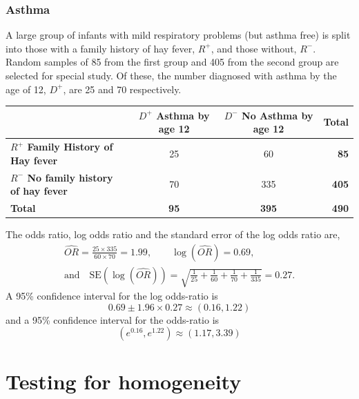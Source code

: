 \documentclass[a4paper]{article}\usepackage[]{graphicx}\usepackage[]{xcolor}
\begin{document}
\subsubsection{Asthma}
A large group of infants with mild respiratory problems (but asthma free) is split into those with a family history of hay fever, \textcolor{myred}{\( R^+ \)}, and those without, \textcolor{myred}{\( R^- \)}. Random samples of 85 from the first group and 405 from the second group are selected for special study. Of these, the number diagnosed with asthma by the age of 12, \textcolor{mygreen}{\( D^+ \)}, are 25 and 70 respectively.
\begin{table}[H]
	\centering
	\begin{tabular}{@{}lccr@{}}
	\toprule
				 														 & \textcolor{mygreen}{\textbf{\( D^+ \) Asthma by age 12}} & \textcolor{mygreen}{\textbf{\( D^- \) No Asthma by age 12}} & \textbf{Total}    \\ \midrule
	\textcolor{myred}{\textbf{\( R^+ \) Family History of Hay fever}}    & 25    		  											& 60        		                                          & \textcolor{myred}{\textbf{85}}  \\
	\textcolor{myred}{\textbf{\( R^- \) No family history of hay fever}} & 70    		  											& 335       		                                          & \textcolor{myred}{\textbf{405}} \\ \midrule
	\textbf{Total} 													     & \textbf{95}    											& \textbf{395}                                                & \textbf{490} \\ \bottomrule
	\end{tabular}
\end{table}
The odds ratio, log odds ratio and the standard error of the log odds ratio are,
\begin{gather*}
	\widehat{OR} = \frac{25 \times 335}{60\times 70} = 1.99, \quad \quad \log(\widehat{OR}) = 0.69,\\
	\text{and}\quad\text{SE}(\log(\widehat{OR})) = \sqrt{\frac{1}{25} + \frac{1}{60} + \frac{1}{70} + \frac{1}{335}} = 0.27.
\end{gather*}
A 95\% confidence interval for the log odds-ratio is
\[
	0.69 \pm 1.96 \times 0.27 \approx (0.16,1.22)
\]
and a 95\% confidence interval for the odds-ratio is 
\[ 
	(e^{0.16},e^{1.22}) \approx (1.17,3.39) 
\]

\section{Testing for homogeneity}\label{sec:7}
\end{document}
